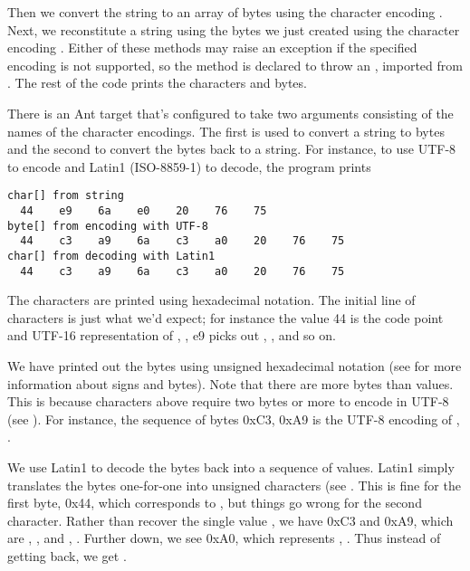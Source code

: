 Then we convert the string  to an array of bytes
 using the character encoding .  Next, we
reconstitute a string using the bytes we just created using the
character encoding .  Either of these methods may raise
an exception if the specified encoding is not supported, so the 
 method is declared to throw an
, imported from .
The rest of the code prints the characters and bytes.

There is an Ant target  that's configured to take
two arguments consisting of the names of the character encodings.  The
first is used to convert a string to bytes and the second to convert
the bytes back to a string.  For instance, to use UTF-8 to encode and
Latin1 (ISO-8859-1) to decode, the program prints 
%
\begin{verbatim}
char[] from string
  44    e9    6a    e0    20    76    75
byte[] from encoding with UTF-8
  44    c3    a9    6a    c3    a0    20    76    75
char[] from decoding with Latin1
  44    c3    a9    6a    c3    a0    20    76    75
\end{verbatim}
%
The characters are printed using hexadecimal notation.  The initial
line of characters is just what we'd expect; for instance the
 value 44 is the code point and UTF-16 representation of
, ,  e9
picks out , , and so on.

We have printed out the bytes using unsigned hexadecimal notation (see
 for more information about signs and bytes).  
Note that there are more bytes than  values.  This is
because characters above  require two bytes or more to
encode in UTF-8 (see ).  For instance, the sequence of
bytes 0xC3, 0xA9 is the UTF-8 encoding of
, .

We use Latin1 to decode the bytes back into a sequence of 
values.  Latin1 simply translates the bytes one-for-one into unsigned
characters (see .  This is fine for the first byte,
0x44, which corresponds to , but things go wrong for the
second character.  Rather than recover the single  value
, we have 0xC3 and 0xA9, which are ,
, and , 
.  Further down, we see 0xA0, which
represents , .  Thus instead
of getting  back, we get 
.  

